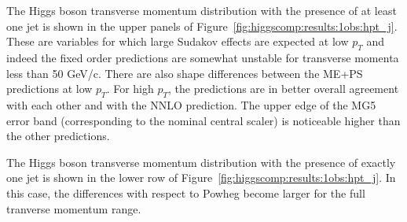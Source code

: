 The Higgs boson transverse momentum distribution with the presence of
at least one jet is shown in the upper panels of
Figure~\ref{fig:higgscomp:results:1obs:hpt_j}. These are variables for
which large Sudakov effects are expected at low $p_T$ and indeed the
fixed order predictions are somewhat unstable for transverse momenta
less than 50 GeV/c. There are also shape differences between the ME+PS
predictions at low $p_T$. For high $p_T$, the predictions are in
better overall agreement with each other and with the NNLO
prediction. The upper edge of the MG5 error band (corresponding to the
nominal central scaler) is noticeable higher than the other
predictions.

The Higgs boson transverse momentum distribution with the presence of
exactly one jet is shown in the lower row of
Figure~\ref{fig:higgscomp:results:1obs:hpt_j}. In this case, the
differences with respect to Powheg become larger for the full
tranverse momentum range.


